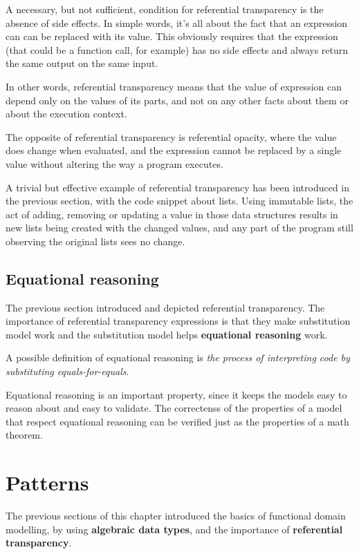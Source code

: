 A necessary, but not sufficient, condition for referential transparency
is the absence of side effects. In simple words, it's all about the fact
that an expression can can be replaced with its value. This obviously
requires that the expression (that could be a function call, for
example) has no side effects and always return the same output on the
same input.

In other words, referential transparency means that the value of
expression can depend only on the values of its parts, and not on any
other facts about them or about the execution context.

The opposite of referential transparency is referential opacity, where
the value does change when evaluated, and the expression cannot be
replaced by a single value without altering the way a program executes.

A trivial but effective example of referential transparency has been
introduced in the previous section, with the code snippet about lists.
Using immutable lists, the act of adding, removing or updating a value
in those data structures results in new lists being created with the
changed values, and any part of the program still observing the original
lists sees no change.

\subsection{Equational reasoning}\label{equational-reasoning}

The previous section introduced and depicted referential transparency.
The importance of referential transparency expressions is that they make
substitution model work and the substitution model helps
\textbf{equational reasoning} work.

A possible definition of equational reasoning is \emph{the process of
interpreting code by substituting equals-for-equals}.

Equational reasoning is an important property, since it keeps the models
easy to reason about and easy to validate. The correctenss of the
properties of a model that respect equational reasoning can be verified
just as the properties of a math theorem.


\section{Patterns}\label{patterns}

The previous sections of this chapter introduced the basics of
functional domain modelling, by using \textbf{algebraic data types}, and
the importance of \textbf{referential transparency}.

